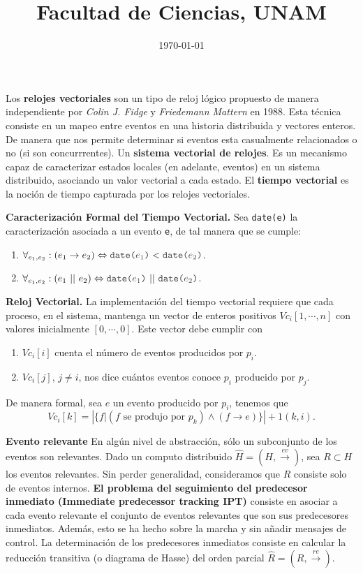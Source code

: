 \documentclass{article}
\title{Facultad de Ciencias, UNAM}
\date{\today}
\newcommand{\code}[1]{\textcolor{white!25!black}{\texttt{#1}}}
\begin{document}


\newpage

Los \textbf{relojes vectoriales} son un tipo de
reloj lógico propuesto de manera independiente por
\textit{Colin J. Fidge} y \textit{Friedemann Mattern}
en 1988. 
Esta técnica consiste en un mapeo entre eventos en una
historia distribuida y vectores enteros.
De manera que nos permite determinar si eventos esta casualmente 
relacionados o no (si son concurrrentes). 
Un \textbf{sistema vectorial de relojes}. Es un mecanismo capaz 
de caracterizar estados locales (en adelante, eventos) en un sistema
distribuido, asociando un valor vectorial a cada estado.
El \textbf{tiempo vectorial} es la noción de tiempo capturada
por los relojes vectoriales.

\textbf{Caracterización Formal del Tiempo Vectorial.} Sea
\code{date(e)} la caracterización asociada a un evento \code{e},
de tal manera que se cumple:
\begin{enumerate}
\item $\forall_{e_1, e_2}:\left(e_1 \rightarrow e_2\right)
  \Leftrightarrow \code{date($e_1$)} < \code{date($e_2$)}$.
\item $\forall_{e_1, e_2}: \left(e_1\ ||\ e_2\right) \Leftrightarrow
  \code{date($e_1$)}\ ||\ \code{date($e_2$)}$.
\end{enumerate}

\textbf{Reloj Vectorial.} La implementación del tiempo
    vectorial requiere que cada proceso, en el sistema,
    mantenga un vector de enteros positivos $Vc_i[1, \dotsm, n]$
    con valores inicialmente $[0, \dotsm, 0]$. Este vector
    debe cumplir con
    \begin{enumerate}
    \item $Vc_i[i]$ cuenta el número de eventos producidos por
      $p_i$.
    \item $Vc_i[j]$, $j \not= i$, nos dice cuántos eventos conoce
      $p_i$ producido por $p_j$.
    \end{enumerate}
    De manera formal, sea $e$ un evento producido por $p_i$,
    tenemos que
    \[Vc_i[k] = \left|\{f | (f \text{ se produjo por } p_k) \land
    (f \rightarrow e)\}\right| + 1(k, i).\]


    \textbf{Evento relevante} En algún nivel de abstracción, sólo un subconjunto de los eventos son relevantes. Dado un computo distribuido
    $\widehat{H}=(H,\xrightarrow[]{ev})$, sea $R\subset H$ los eventos relevantes. Sin perder generalidad, consideramos que $R$ consiste solo de eventos internos.
    \textbf{El problema del seguimiento del predecesor inmediato (Immediate predecessor tracking IPT)} consiste en asociar a cada evento relevante el conjunto de eventos relevantes que son sus predecesores inmediatos. Además, esto se ha hecho sobre la marcha y sin añadir mensajes de control. La determinación de los predecesores inmediatos consiste en calcular la reducción transitiva (o diagrama de Hasse) del orden parcial $\widehat{R}=(R,\xrightarrow[]{re})$. 
\end{document}
